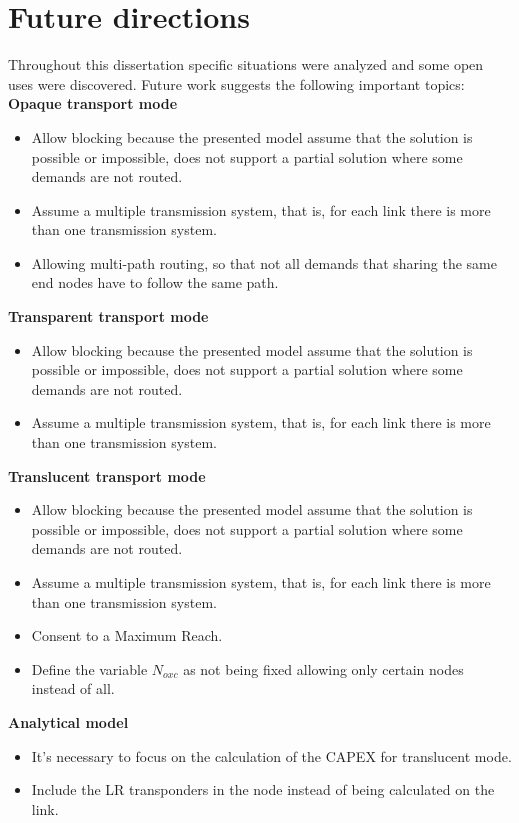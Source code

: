\clearpage

\section{Future directions}
\label{future}

Throughout this dissertation specific situations were analyzed and some open uses were discovered. Future work suggests the following important topics:\\

\textbf{Opaque transport mode}
\begin{itemize}
  \item Allow blocking because the presented model assume that the solution is possible or impossible, does not support a partial solution where some demands are not routed.
  \item Assume a multiple transmission system, that is, for each link there is more than one transmission system.
  \item Allowing multi-path routing, so that not all demands that sharing the same end nodes have to follow the same path.
\end{itemize}

\textbf{Transparent transport mode}
\begin{itemize}
  \item Allow blocking because the presented model assume that the solution is possible or impossible, does not support a partial solution where some demands are not routed.
  \item Assume a multiple transmission system, that is, for each link there is more than one transmission system.
\end{itemize}

\textbf{Translucent transport mode}
\begin{itemize}
  \item Allow blocking because the presented model assume that the solution is possible or impossible, does not support a partial solution where some demands are not routed.
  \item Assume a multiple transmission system, that is, for each link there is more than one transmission system.
  \item Consent to a Maximum Reach.
  \item Define the variable $N_{oxc}$ as not being fixed allowing only certain nodes instead of all.
\end{itemize}

\textbf{Analytical model}
\begin{itemize}
  \item It's necessary to focus on the calculation of the CAPEX for translucent mode.
  \item Include the LR transponders in the node instead of being calculated on the link.
\end{itemize}
